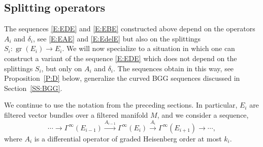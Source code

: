 \documentclass[reqno,12pt]{amsart}
\DeclareMathOperator{\gr}{gr}
\theoremstyle{plain}
\theoremstyle{definition}
\begin{document}
\subsection{Splitting operators}\label{SS:splitting-operators}






The sequences \eqref{E:EDE} and \eqref{E:EBE} constructed above depend on the operators $A_i$ and $\delta_i$, see \eqref{E:EAE} and \eqref{E:EdelE} but also on the splittings $S_i\colon\gr(E_i)\to E_i$. 
We will now specialize to a situation in which one can construct a variant of the sequence \eqref{E:EDE} which does not depend on the splittings $S_i$, but only on $A_i$ and $\delta_i$.
The sequences obtain in this way, see Proposition~\ref{P:D} below, generalize the curved BGG sequences \cite{CSS01,CD01} discussed in Section~\ref{SS:BGG}.


We continue to use the notation from the preceding sections.
In particular, $E_i$ are filtered vector bundles over a filtered manifold $M$, and we consider a sequence,
\begin{equation}\label{E:EAE2}
\cdots\to\Gamma^\infty(E_{i-1})\xrightarrow{A_{i-1}}\Gamma^\infty(E_i)\xrightarrow{A_i}\Gamma^\infty(E_{i+1})\to\cdots,
\end{equation}
where $A_i$ is a differential operator of graded Heisenberg order at most $k_i$.
\end{document}
